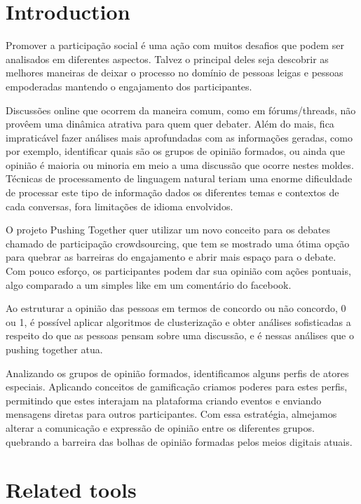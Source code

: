 \documentclass{llncs}
\begin{document}
\section{Introduction}
\label{sec:intro}
  Promover a participação social é uma ação com muitos desafios que podem
  ser analisados em diferentes aspectos. Talvez o principal deles seja descobrir
  as melhores maneiras de deixar o processo no domínio  de pessoas leigas e 
  pessoas empoderadas mantendo o engajamento dos participantes. 

  Discussões online que ocorrem da maneira comum, como em fórums/threads,
  não provêem uma dinâmica atrativa para quem quer debater. Além do mais, fica
  impraticável fazer análises mais aprofundadas com as informações geradas,
  como por exemplo, identificar quais são os grupos de opinião formados, ou ainda
  que opinião é maioria ou minoria em meio a uma discussão que ocorre nestes
  moldes. Técnicas de processamento de linguagem natural teriam uma enorme
  dificuldade de processar este tipo de informação dados os diferentes temas
  e contextos de cada conversas, fora limitações de idioma envolvidos.

  O projeto Pushing Together quer utilizar um novo conceito para os debates
  chamado de participação crowdsourcing, que tem se mostrado uma ótima opção
  para quebrar as barreiras do engajamento e abrir mais espaço para o debate. Com
  pouco esforço, os participantes podem dar sua opinião com ações pontuais,
  algo comparado a um simples like em um comentário do facebook.

  Ao estruturar a opinião das pessoas em termos de concordo ou não concordo, 0 ou 1, é
  possível aplicar algoritmos de clusterização e obter análises sofisticadas a
  respeito do que as pessoas pensam sobre uma discussão, e é nessas análises que o pushing together atua.

  Analizando os grupos de opinião formados, identificamos alguns perfis de
  atores especiais. Aplicando conceitos de gamificação criamos poderes para
  estes perfis, permitindo que estes interajam na plataforma criando
  eventos e enviando mensagens diretas para outros participantes. Com essa
  estratégia, almejamos alterar a comunicação e expressão de opinião entre os diferentes grupos.
  quebrando a barreira das bolhas de opinião formadas pelos meios digitais atuais.

\section{Related tools}
\end{document}
